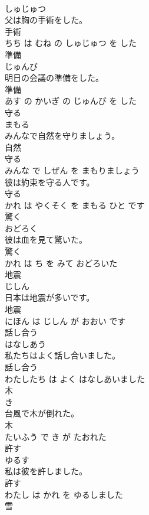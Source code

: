 \documentclass[8pt]{extreport}
\begin{document}
\begin{CJK}{UTF8}{min}
\\	しゅじゅつ			
\\	父は胸の手術をした。	
\\	手術 
\\	ちち は むね の しゅじゅつ を した			
\\	準備	
\\	じゅんび			
\\	明日の会議の準備をした。	
\\	準備 
\\	あす の かいぎ の じゅんび を した			
\\	守る	
\\	まもる			
\\	みんなで自然を守りましょう。	
\\	自然 
\\	守る 
\\	みんな で しぜん を まもりましょう			
\\	彼は約束を守る人です。	
\\	守る 
\\	かれ は やくそく を まもる ひと です			
\\	驚く	
\\	おどろく			
\\	彼は血を見て驚いた。	
\\	驚く 
\\	かれ は ち を みて おどろいた			
\\	地震	
\\	じしん			
\\	日本は地震が多いです。	
\\	地震 
\\	にほん は じしん が おおい です			
\\	話し合う	
\\	はなしあう			
\\	私たちはよく話し合いました。	
\\	話し合う 
\\	わたしたち は よく はなしあいました			
\\	木	
\\	き			
\\	台風で木が倒れた。	
\\	木 
\\	たいふう で き が たおれた			
\\	許す	
\\	ゆるす			
\\	私は彼を許しました。	
\\	許す 
\\	わたし は かれ を ゆるしました			
\\	雪	

\end{CJK}
\end{document}
